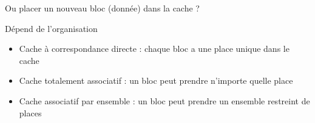%
\begin{Frame}{Ou placer un nouveau bloc (donnée) dans la cache ?}


      \begin{block}{Dépend de l'organisation}{}
        \begin{itemize}
        \item Cache à correspondance directe : chaque bloc a une place unique dans le cache
	\item Cache totalement associatif : un bloc peut prendre n'importe quelle place
	\item Cache associatif par ensemble : un bloc peut prendre un ensemble restreint de places
        \end{itemize}
      \end{block} 

        \begin{center}
        \end{center}

      
\end{Frame}


